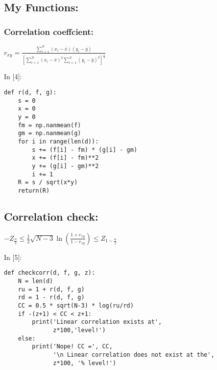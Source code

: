 \documentclass[11pt]{article}
\newif\ifcode
\newif\ifleftmargins
\newlength{\promptlength}
\newcommand{\prompt}[3]{
        \needspace{1.1cm}
        \settowidth{\promptlength}{ #1 [#3] }
        \ifleftmargins\hspace{-\promptlength}\hspace{-5pt}\fi
        {\color{#2}#1 [#3]:}
        \ifleftmargins\vspace{-2.7ex}\fi
    }
\begin{document}
    \hypertarget{my-functions}{%
\subsection{My Functions:}\label{my-functions}}

\hypertarget{correlation-coeffcient}{%
\subsubsection{Correlation coeffcient:}\label{correlation-coeffcient}}

\(r_{xy} = \frac{ \sum_{i=1}^N (x_i - \bar{x})(y_i - \bar{y})} {\left[ \sum_{i=1}^N(x_i - \bar{x})^2 \sum_{i=1}^N(y_i - \bar{y})^2 \right]^{\frac{1}{2}} }\)

    
\prompt{In}{incolor}{4}
\codetrue
\begin{tcolorbox}[breakable, size=fbox, boxrule=1pt, pad at break*=1mm, colback=cellbackground, colframe=cellborder]
\begin{verbatim}
def r(d, f, g):
    s = 0
    x = 0
    y = 0
    fm = np.nanmean(f)
    gm = np.nanmean(g)
    for i in range(len(d)):
        s += (f[i] - fm) * (g[i] - gm) 
        x += (f[i] - fm)**2
        y += (g[i] - gm)**2
        i += 1
    R = s / sqrt(x*y)
    return(R)
\end{verbatim}
\end{tcolorbox}
\codefalse

    \hypertarget{correlation-check}{%
\subsection{Correlation check:}\label{correlation-check}}

\(-Z_\frac{\alpha}{2} \leq \frac{1}{2} \sqrt{N-3} \ln{\left(\frac{1+r_{xy}}{1-r_{xy}}\right)} \leq Z_{1-\frac{\alpha}{2}}\)

    
\prompt{In}{incolor}{5}
\codetrue
\begin{tcolorbox}[breakable, size=fbox, boxrule=1pt, pad at break*=1mm, colback=cellbackground, colframe=cellborder]
\begin{verbatim}
def checkcorr(d, f, g, z):
    N = len(d)
    ru = 1 + r(d, f, g)
    rd = 1 - r(d, f, g)
    CC = 0.5 * sqrt(N-3) * log(ru/rd)
    if -(z+1) < CC < z+1: 
        print('Linear correlation exists at', 
              z*100,'level!')
    else:
        print('Nope! CC =', CC, 
              '\n Linear correlation does not exist at the', 
              z*100, '% level!')
\end{verbatim}
\end{tcolorbox}
\codefalse
\end{document}
